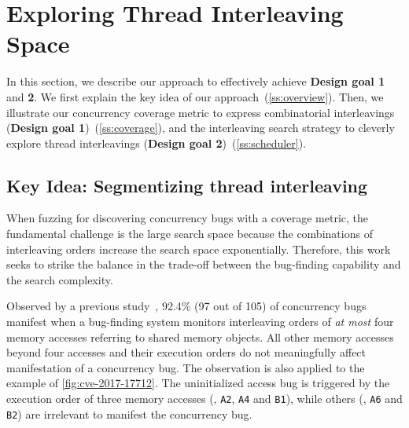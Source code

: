 \section{Exploring Thread Interleaving Space}
\label{s:design}

In this section, we describe our approach to effectively achieve
\textbf{Design goal 1} and \textbf{2}.
%
We first explain the key idea of our approach~(\autoref{ss:overview}).
Then, we illustrate our concurrency coverage metric to express
combinatorial interleavings (\textbf{Design goal
  1})~(\autoref{ss:coverage}), and the interleaving search strategy to
cleverly explore thread interleavings (\textbf{Design goal
  2})~(\autoref{ss:scheduler}).


\subsection{Key Idea: Segmentizing thread interleaving}
\label{ss:overview}


When fuzzing for discovering concurrency bugs with a coverage metric,
the fundamental challenge is the large search space because the
combinations of interleaving orders increase the search space
exponentially.
%
Therefore, this work seeks to strike the balance in the trade-off
between the bug-finding capability and the search complexity.

Observed by a previous study~\cite{learningfrommistakes}, 92.4\% (97
out of 105) of concurrency bugs manifest when a bug-finding system
monitors interleaving orders of \textit{at most} four memory accesses
referring to shared memory objects.
%
All other memory accesses beyond four accesses and their execution
orders do not meaningfully affect manifestation of a concurrency bug.
%
The observation is also applied to the example of
\autoref{fig:cve-2017-17712}. The uninitialized access bug is
triggered by the execution order of three memory accesses (\eg,
\texttt{A2}, \texttt{A4} and \texttt{B1}), while others (\eg,
\texttt{A6} and \texttt{B2}) are irrelevant to manifest the
concurrency bug.


